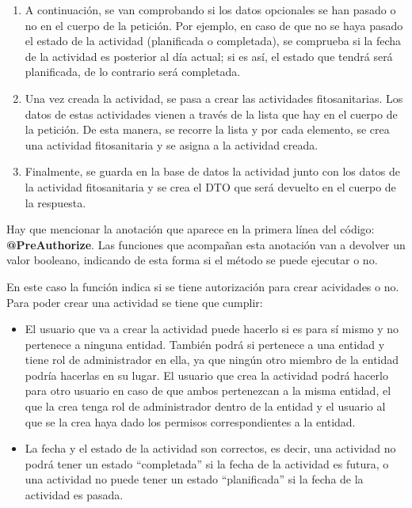 \begin{itemize}
\begin{enumerate}
        \item A continuación, se van comprobando si los datos opcionales se han pasado o no en el cuerpo de la petición. Por ejemplo, en caso de que no se haya pasado el estado de 
        la actividad (planificada o completada), se comprueba si la fecha de la actividad es posterior al día actual; si es así, el estado que tendrá será planificada, de lo contrario
        será completada.

        \item Una vez creada la actividad, se pasa a crear las actividades fitosanitarias. Los datos de estas actividades vienen a través de la lista que hay en el cuerpo de la petición.
        De esta manera, se recorre la lista y por cada elemento, se crea una actividad fitosanitaria y se asigna a la actividad creada.

        \item Finalmente, se guarda en la base de datos la actividad junto con los datos de la actividad fitosanitaria y se crea el DTO que será devuelto en el cuerpo de la respuesta.
    \end{enumerate}

    Hay que mencionar la anotación que aparece en la primera línea del código: \textbf{@PreAuthorize}. Las funciones que acompañan esta anotación van a devolver un valor booleano, indicando
    de esta forma si el método se puede ejecutar o no.

    En este caso la función indica si se tiene autorización para crear acividades o no. Para poder crear una actividad se tiene que cumplir:

    \begin{itemize}
        \item El usuario que va a crear la actividad puede hacerlo si es para sí mismo y no pertenece a ninguna entidad. También podrá si pertenece a una entidad y tiene rol de administrador en 
        ella, ya que ningún otro miembro de la entidad podría hacerlas en su lugar. El usuario que crea la actividad podrá hacerlo para otro usuario en caso de que ambos pertenezcan a la misma 
        entidad, el que la crea tenga rol de administrador dentro de la entidad y el usuario al que se la crea haya dado los permisos correspondientes a la entidad. 

        \item La fecha y el estado de la actividad son correctos, es decir, una actividad no podrá tener un estado ``completada'' si la fecha de la actividad es futura, o una actividad no puede tener
        un estado ``planificada'' si la fecha de la actividad es pasada.


\end{itemize}
\end{itemize}
